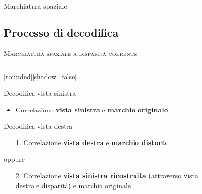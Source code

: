\documentclass{beamer}
\begin{document}
\begin{section}{Marchiatura spaziale}
\subsection{Processo di decodifica}
\begin{frame}[t]{\textsc{Marchiatura spaziale a disparit\`{a} coerente}}
\vspace{-0.5em}
\begin{columns}
\begin{column}{6cm}
	[rounded][shadow=false]
\vspace{1em}
\begin{block}{Decodifica vista sinistra}
\begin{itemize}
\item Correlazione \textbf{vista sinistra} e \textbf{marchio originale}
\end{itemize}
\end{block}
\begin{block}{Decodifica vista destra}
\begin{itemize}
\item[1.] Correlazione \textbf{vista destra} e \textbf{marchio distorto}
\end{itemize}
\vspace{-0.5em}
oppure
\begin{itemize}
\item[2.] Correlazione \textbf{vista sinistra ricostruita} (attraverso vista destra e disparit\`{a}) e marchio originale
\end{itemize}
\end{block}
\end{column}
\begin{column}{5cm}
\vspace{2em}
\begin{center}
\begin{figure}

\end{figure}
\end{center}
\end{column}
\end{columns}
\end{frame}
\end{section}
\end{document}
